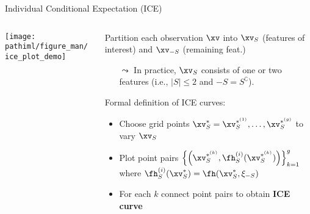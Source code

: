 \documentclass[11pt,compress,t,notes=noshow, aspectratio=169, xcolor=table]{beamer}
\newcommand{\pathiml}{../../slides/03_feature-effects/}
\begin{document}
\begin{frame}[c]{Individual Conditional Expectation (ICE) }

\begin{columns}[T]
\begin{column}{0.16\textwidth} %
\texttt{[image: \\pathiml/figure\_man/ice\_plot\_demo]}
\end{column}
\begin{column}{0.84\textwidth}


Partition each observation $\xv$ into $\xv_S$ (features of interest) and $\xv_{-S}$ (remaining feat.)
\begin{itemize}
    \item[$\leadsto$] In practice, $\xv_S$ consists of one or two features (i.e., $|S| \leq 2$ and ${-S} = S^\complement$).
\end{itemize}

\bigskip

Formal definition of ICE curves: 
\begin{itemize}
    \item Choose grid points $\xv_S^* = \xv_S^{*^{(1)}}, \dots, \xv_S^{*^{(g)}}$ to vary $\xv_S$
    \item Plot point pairs $ \Bigl\{\left(\xv_S^{*^{(k)}}, \fh_S^{(i)}(\xv_S^{*^{(k)}}) \right) \Bigr\}_{k=1}^g $ where $\fh_{S}^{(i)}(\xv_S^*) = \fh(\xv_S^*, \xi_{-S})$
    \item For each $k$ connect point pairs to obtain \textbf{ICE curve}
\end{itemize}


\end{column}
\end{columns}
\end{frame}
\end{document}
